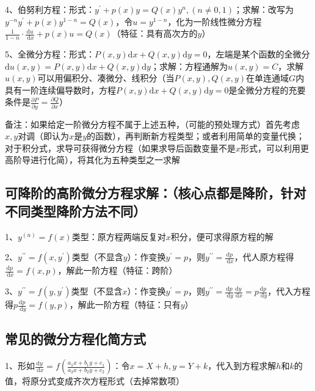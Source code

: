 4、伯努利方程：形式：$y^{\prime}+p(x) y=Q(x) y^{n},(n \neq 0,1)$；求解：改写为$y^{-n} y^{\prime}+p(x) y^{1-n}=Q(x)$，令$u=y^{1-n}$，化为一阶线性微分方程$\frac{1}{1-n} \cdot \frac{\mathrm{d} u}{\mathrm{~d} x}+p(x) u=Q(x)$（特征：具有高次方的$y$）

5、全微分方程：形式：$P(x, y) \mathrm{d} x+Q(x, y) \mathrm{d} y=0$，左端是某个函数的全微分$\mathrm{d} u(x, y)=P(x, y) \mathrm{d} x+Q(x, y) \mathrm{d} y$；求解：方程通解为$u(x, y)=C$，求解$u(x, y)$可以用偏积分、凑微分、线积分（当$P(x, y), Q(x, y)$在单连通域$G$内具有一阶连续偏导数时，方程$P(x, y) \mathrm{d} x+Q(x, y) \mathrm{d} y=0$是全微分方程的充要条件是$\frac{\partial P}{\partial y}=\frac{\partial Q}{\partial x}$）

备注：如果给定一阶微分方程不属于上述五种，（可能的预处理方式）首先考虑$x,y$对调（即认为$x$是$y$的函数），再判断新方程类型；或者利用简单的变量代换；对于积分式，求导可获得微分方程（如果求导后函数变量不是$x$形式，可以利用更高阶导进行化简），将其化为五种类型之一求解



\subsection{可降阶的高阶微分方程求解：（核心点都是降阶，针对不同类型降阶方法不同）}

1、${y}^{(n)}={f}({x})$类型：原方程两端反复对$x$积分，便可求得原方程的解

2、${y}^{\prime \prime}={f}\left({x}, {y}^{\prime}\right)$类型（不显含${y}$）：作变换$y^{\prime}=p$，则$y^{\prime \prime}=\frac{\mathrm{d} p}{\mathrm{~d} x}$，代人原方程得$\frac{\mathrm{d} p}{\mathrm{~d} x}=f(x, p)$，解此一阶方程（特征：跨阶）

3、${y}^{\prime \prime}={f}\left({y}, {y}^{\prime}\right)$类型（不显含$x$）：作变换$y^{\prime}=p$，则$y^{\prime \prime}=\frac{\mathrm{d} p}{\mathrm{~d} y} \frac{\mathrm{d} y}{\mathrm{~d} x}=p \frac{\mathrm{d} p}{\mathrm{~d} y}$，代入方程得$p \frac{\mathrm{d} p}{\mathrm{~d} y}=f(y, p)$，解此一阶方程（特征：只有$y$）



\subsection{常见的微分方程化简方式}

1、形如$\frac{\mathrm{d} y}{\mathrm{~d} x}=f\left(\frac{a_{1} x+b_{1} y+c_{1}}{a_{2} x+b_{2} y+c_{2}}\right)$：令$x=X+h, y=Y+k$，代入到方程求解$h$和$k$的值，将原分式变成齐次方程形式（去掉常数项）

